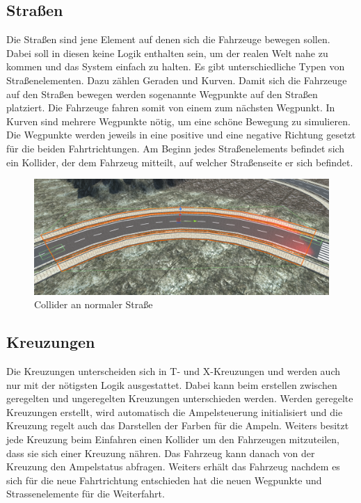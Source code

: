 \subsection{Straßen}

Die Straßen sind jene Element auf denen sich die Fahrzeuge bewegen sollen. Dabei soll in diesen keine Logik enthalten sein, um der realen Welt nahe zu kommen und das System einfach zu halten. Es gibt unterschiedliche Typen von Straßenelementen. Dazu zählen Geraden und Kurven. Damit sich die Fahrzeuge auf den Straßen bewegen werden sogenannte Wegpunkte auf den Straßen platziert. Die Fahrzeuge fahren somit von einem zum nächsten Wegpunkt. In Kurven sind mehrere Wegpunkte nötig, um eine schöne Bewegung zu simulieren. Die Wegpunkte werden jeweils in eine positive und eine negative Richtung gesetzt für die beiden Fahrtrichtungen. Am Beginn jedes Straßenelements befindet sich ein Kollider, der dem Fahrzeug mitteilt, auf welcher Straßenseite er sich befindet.

\begin{figure}[H]
\begin{center}
	\includegraphics[width=1\textwidth]{BilderAllgemein/street_collider.png}
\end{center}
	\caption{Collider an normaler Straße}
	\label{img:street_collider}
\end{figure}

\subsection{Kreuzungen}

Die Kreuzungen unterscheiden sich in T- und X-Kreuzungen und werden auch nur mit der nötigsten Logik ausgestattet. Dabei kann beim erstellen zwischen geregelten und ungeregelten Kreuzungen unterschieden werden. Werden geregelte Kreuzungen erstellt, wird automatisch die Ampelsteuerung initialisiert und die Kreuzung regelt auch das Darstellen der Farben für die Ampeln. Weiters besitzt jede Kreuzung beim Einfahren einen Kollider um den Fahrzeugen mitzuteilen, dass sie sich einer Kreuzung nähren. Das Fahrzeug kann danach von der Kreuzung den Ampelstatus abfragen. Weiters erhält das Fahrzeug nachdem es sich für die neue Fahrtrichtung entschieden hat die neuen Wegpunkte und Strassenelemente für die Weiterfahrt.

